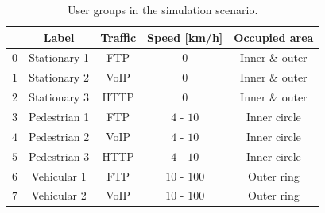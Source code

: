 				\begin{table}[t]
					\centering
					\renewcommand*{\arraystretch}{1.25}
					\begin{tabular}{l|c|c|c|c}
						& Label            & Traffic   & Speed [km/h] & Occupied area	\\
						\hline
						$0$ & Stationary 1 & \ac{FTP}  & $0$          & Inner \& outer	\\
						$1$ & Stationary 2 & \ac{VoIP} & $0$          & Inner \& outer	\\
						$2$ & Stationary 3 & \ac{HTTP} & $0$          & Inner \& outer	\\
						$3$ & Pedestrian 1 & \ac{FTP}  & $4$ - $10$   & Inner circle	\\
						$4$ & Pedestrian 2 & \ac{VoIP} & $4$ - $10$   & Inner circle	\\
						$5$ & Pedestrian 3 & \ac{HTTP} & $4$ - $10$   & Inner circle	\\
						$6$ & Vehicular 1  & \ac{FTP}  & $10$ - $100$ & Outer ring		\\
						$7$ & Vehicular 2  & \ac{VoIP} & $10$ - $100$ & Outer ring		\\
					\end{tabular}
					\caption{User groups in the simulation scenario.}
					\label{tab:imp_user_groups}
				\end{table}			
				
				
